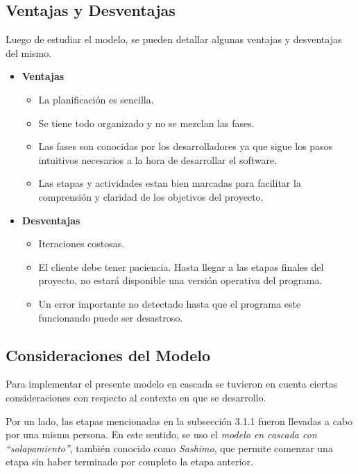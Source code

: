 \subsection{Ventajas y Desventajas}
\par Luego de estudiar el modelo, se pueden detallar algunas ventajas y desventajas del mismo.
\begin{itemize}
    \item \textbf{Ventajas} 
	    \begin{itemize}    	
	    	\item La planificación es sencilla.
	    	\item Se tiene todo organizado y no se mezclan las fases.
	    	\item Las fases son conocidas por los desarrolladores ya que sigue los pasos intuitivos necesarios a la hora de desarrollar el software.
	    	\item Las etapas y actividades estan bien marcadas para facilitar la comprensión y claridad de los objetivos del proyecto.
	    \end{itemize}
	  
	\item \textbf{Desventajas}
		\begin{itemize}
			\item Iteraciones costosas.
			\item El cliente debe tener paciencia. Hasta llegar a las etapas finales del proyecto, no estará disponible una versión operativa del programa. 
			\item Un error importante no detectado hasta que el
            programa este funcionando puede ser desastroso. 
		\end{itemize}
\end{itemize}

\subsection{Consideraciones del Modelo}
\par Para implementar el presente modelo en cascada se tuvieron en cuenta ciertas consideraciones con respecto al contexto en que se desarrollo.

\par Por un lado, las etapas mencionadas en la subsección 3.1.1 fueron llevadas a cabo por una misma persona. En este sentido, se uso el \emph{modelo en cascada con ``solapamiento''}, también conocido como \emph{Sashimo}\cite{Mcconnell96}, que permite comenzar una etapa sin haber terminado por completo la etapa anterior. 

